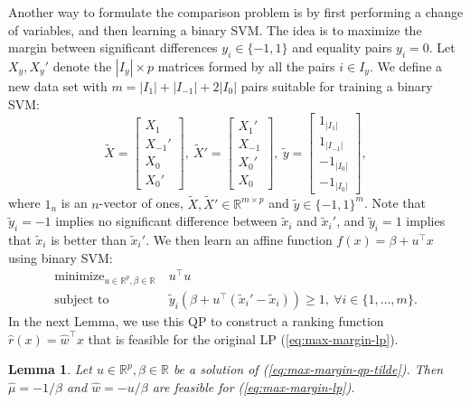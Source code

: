 \documentclass{article}
\newtheorem{lemma}{Lemma}
\newcommand{\RR}{\mathbb R}
\DeclareMathOperator*{\minimize}{minimize}
\begin{document}
Another way to formulate the comparison problem is by first performing
a change of variables, and then learning a binary SVM. The idea is to
maximize the margin between significant differences $y_i\in\{-1,1\}$
and equality pairs $y_i=0$. Let $X_y,X_y'$ denote the $|I_y|\times p$
matrices formed by all the pairs $i\in I_y$. We define a new data set
with $m=|I_1|+|I_{-1}|+2|I_0|$ pairs suitable for training a binary
SVM:
\begin{equation}
  \tilde X = \left[
    \begin{array}{c}
      X_1 \\
      X_{-1}'\\
      X_0\\
      X_0'
    \end{array}
  \right],\ 
  \tilde X' = \left[
    \begin{array}{c}
      X_1' \\
      X_{-1}\\
      X_0'\\
      X_0
    \end{array}
  \right],\ 
  \tilde y = \left[
    \begin{array}{c}
      1_{|I_1|} \\
      1_{|I_{-1}|}\\
      -1_{|I_0|}\\
      -1_{|I_0|}
    \end{array}
  \right],
\end{equation}
where $1_n$ is an $n$-vector of ones, $\tilde X,\tilde
X'\in\RR^{m\times p}$ and $\tilde y\in\{-1,1\}^m$. Note that $\tilde
y_i=-1$ implies no significant difference between $\tilde x_i$ and
$\tilde x_i'$, and $\tilde y_i=1$ implies that $\tilde x_i$ is better
than $\tilde x_i'$. We then learn an affine function
$f(x)=\beta+u^\intercal x$ using binary SVM:
\begin{equation}
  \label{eq:max-margin-qp-tilde}
  \begin{aligned}
    \minimize_{u\in\RR^p, \beta\in\RR}\ & u^\intercal u  \\
    \text{subject to}\ & 
    \tilde y_i (\beta + u^\intercal( \tilde x_i'-\tilde x_i) ) \geq 1,
    \ \forall i\in\{1,\dots,m\}.
  \end{aligned}
\end{equation}
In the next Lemma, we use this QP
to
construct a ranking function $\hat r(x)= \hat w^\intercal x$ that is
feasible for the original LP (\ref{eq:max-margin-lp}).
\begin{lemma}
  Let $u\in\RR^p,\beta\in\RR$ be a solution of
  (\ref{eq:max-margin-qp-tilde}). Then $\hat \mu = -1/\beta$
  and $\hat w = -u/\beta$ are feasible for
  (\ref{eq:max-margin-lp}).
  \label{lemma:feasible}
\end{lemma}
\end{document}
